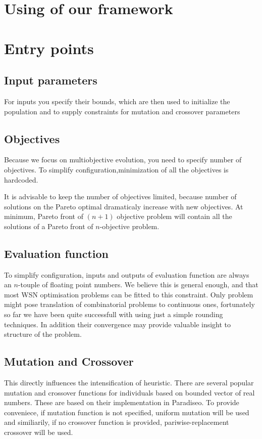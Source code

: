 \documentclass[12pt,oneside]{fithesis2}
\begin{document}
\section{Using of our framework}

\section{Entry points}

\subsection{Input parameters}
For inputs you specify their bounds, which are then used to initialize the population and to supply constraints for mutation and crossover parameters

\subsection{Objectives}
Because we focus on multiobjective evolution, you need to specify number of objectives. To simplify configuration,minimization of all the objectives is hardcoded.

It is advisable to keep the number of objectives limited, because number of solutions on the Pareto optimal dramaticaly increase with new objectives. At minimum, Pareto front of $(n+1)$ objective problem will contain all the solutions of a Pareto front of $n$-objective problem. \cite{talbi2009metaheuristics}

\subsection{Evaluation function}

To simplify configuration, inputs and outputs of evaluation function are always an $n$-touple of floating point numbers. We believe this is general enough, and that most WSN optimisation problems can be fitted to this constraint. Only problem might pose translation of combinatorial problems to continuous ones, fortunately so far we have been quite successfull with using just a simple rounding techniques. In addition their convergence may provide valuable insight to structure of the problem.

\subsection{Mutation and Crossover}
This directly influences the intensification of heuristic. There are several popular mutation and crossover functions for individuals based on bounded vector of real numbers. These are based on their implementation in Paradiseo. To provide conveniece, if mutation function is not specified, uniform mutation will be used and similiarily, if no crossover function is provided, pariwise-replacement crossover will be used. 
\end{document}
